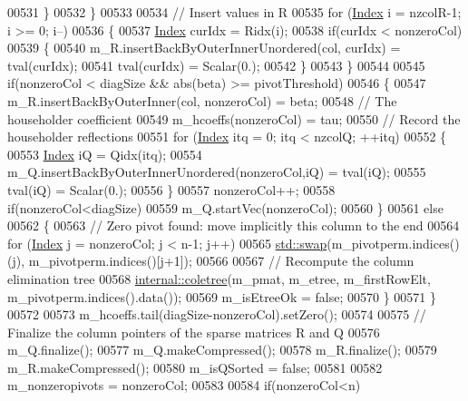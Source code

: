 \begin{DoxyCode}
00531       \}
00532     \}
00533 
00534     \textcolor{comment}{// Insert values in R}
00535     \textcolor{keywordflow}{for} (\hyperlink{namespace_eigen_a62e77e0933482dafde8fe197d9a2cfde}{Index}  i = nzcolR-1; i >= 0; i--)
00536     \{
00537       \hyperlink{namespace_eigen_a62e77e0933482dafde8fe197d9a2cfde}{Index} curIdx = Ridx(i);
00538       \textcolor{keywordflow}{if}(curIdx < nonzeroCol) 
00539       \{
00540         m\_R.insertBackByOuterInnerUnordered(col, curIdx) = tval(curIdx);
00541         tval(curIdx) = Scalar(0.);
00542       \}
00543     \}
00544 
00545     \textcolor{keywordflow}{if}(nonzeroCol < diagSize && abs(beta) >= pivotThreshold)
00546     \{
00547       m\_R.insertBackByOuterInner(col, nonzeroCol) = beta;
00548       \textcolor{comment}{// The householder coefficient}
00549       m\_hcoeffs(nonzeroCol) = tau;
00550       \textcolor{comment}{// Record the householder reflections}
00551       \textcolor{keywordflow}{for} (\hyperlink{namespace_eigen_a62e77e0933482dafde8fe197d9a2cfde}{Index} itq = 0; itq < nzcolQ; ++itq)
00552       \{
00553         \hyperlink{namespace_eigen_a62e77e0933482dafde8fe197d9a2cfde}{Index} iQ = Qidx(itq);
00554         m\_Q.insertBackByOuterInnerUnordered(nonzeroCol,iQ) = tval(iQ);
00555         tval(iQ) = Scalar(0.);
00556       \}
00557       nonzeroCol++;
00558       \textcolor{keywordflow}{if}(nonzeroCol<diagSize)
00559         m\_Q.startVec(nonzeroCol);
00560     \}
00561     \textcolor{keywordflow}{else}
00562     \{
00563       \textcolor{comment}{// Zero pivot found: move implicitly this column to the end}
00564       \textcolor{keywordflow}{for} (\hyperlink{namespace_eigen_a62e77e0933482dafde8fe197d9a2cfde}{Index} j = nonzeroCol; j < n-1; j++) 
00565         \hyperlink{endian_8c_a3ca5ecd34b04d6a243c054ac3a57f68d}{std::swap}(m\_pivotperm.indices()(j), m\_pivotperm.indices()[j+1]);
00566       
00567       \textcolor{comment}{// Recompute the column elimination tree}
00568       \hyperlink{namespace_eigen_1_1internal_a86181db74ba596a7afbfd89efcc5788c}{internal::coletree}(m\_pmat, m\_etree, m\_firstRowElt, m\_pivotperm.indices().data());
00569       m\_isEtreeOk = \textcolor{keyword}{false};
00570     \}
00571   \}
00572   
00573   m\_hcoeffs.tail(diagSize-nonzeroCol).setZero();
00574   
00575   \textcolor{comment}{// Finalize the column pointers of the sparse matrices R and Q}
00576   m\_Q.finalize();
00577   m\_Q.makeCompressed();
00578   m\_R.finalize();
00579   m\_R.makeCompressed();
00580   m\_isQSorted = \textcolor{keyword}{false};
00581 
00582   m\_nonzeropivots = nonzeroCol;
00583   
00584   \textcolor{keywordflow}{if}(nonzeroCol<n)

\end{DoxyCode}
